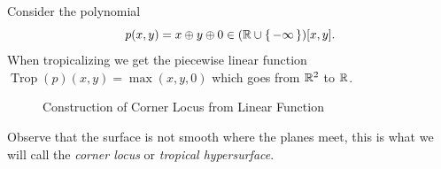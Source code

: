 \documentclass[12pt]{memoir}
\DeclareMathOperator{\Trop}{Trop}
\begin{document}
\begin{Ex}
    Consider the polynomial 
    $$p(x,y)=x\oplus y\oplus 0\in (\mathbb{R}\cup\{\,-\infty\,\})[x,y].$$
    When tropicalizing we get the piecewise linear function $\Trop(p)(x,y)=\max(x,y,0)$ which goes from $\mathbb{R}^2$ to $\mathbb{R}$.
    \begin{figure}[h!]
        \centering
        \quad
        \quad
        \caption{Construction of Corner Locus from Linear Function}
        \label{fig:2.1-and-2.2-and-2.3}
    \end{figure}
    Observe that the surface is not smooth where the planes meet, this is what we will call the \emph{corner locus} or \emph{tropical hypersurface}.
\end{Ex}
\end{document}

